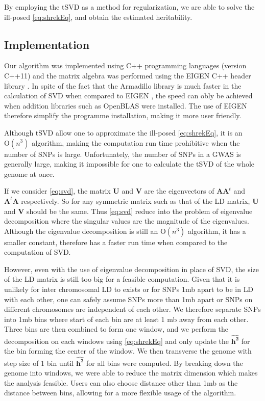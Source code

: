 			By employing the \gls{tSVD} as a method for regularization, we are able to solve the ill-posed \cref{eq:shrekEq}, and obtain the estimated heritability.
		\subsection{Implementation}
			Our algorithm was implemented using C++ programming languages (version C++11) and the matrix algebra was performed using the EIGEN C++ header library \citep{eigenweb}.
			In spite of the fact that the Armadillo library \citep{Sanderson2010} is much faster in the calculation of \gls{SVD} when compared to EIGEN \citep{Ho2011}, the speed can obly be achieved when addition libraries such as OpenBLAS were installed. 
			The use of EIGEN therefore simplify the programme installation, making it more user friendly. 
			
			Although \gls{tSVD} allow one to approximate the ill-posed \cref{eq:shrekEq}, it is an $\mathrm{O}(n^3)$ algorithm, making the computation run time prohibitive when the number of \glspl{SNP} is large.
			Unfortunately, the number of \glspl{SNP} in a \gls{GWAS} is generally large, making it impossible for one to calculate the \gls{tSVD} of the whole genome at once. 
			
			If we consider \cref{eq:svd}, the matrix $\boldsymbol{U}$ and $\boldsymbol{V}$ are the eigenvectors of $\boldsymbol{AA}^t$ and $\boldsymbol{A}^t\boldsymbol{A}$ respectively. 
			So for any symmetric matrix such as that of the \gls{LD} matrix, $\boldsymbol{U}$ and $\boldsymbol{V}$ should be the same. 
			Thus \cref{eq:svd} reduce into the problem of eigenvalue decomposition where the singular values are the magnitude of the eigenvalues. 
			Although the eigenvalue decomposition is still an $\mathrm{O}(n^3)$ algorithm, it has a smaller constant, therefore has a faster run time when compared to the computation of \gls{SVD}. 
			
			However, even with the use of eigenvalue decomposition in place of \gls{SVD}, the size of the \gls{LD} matrix is still too big for a feasible computation. 
			Given that it is unlikely for inter chromosomal \gls{LD} to exists or for \glspl{SNP} 1\gls{mb} apart to be in \gls{LD} with each other, one can safely assume \glspl{SNP} more than 1\gls{mb} apart or \glspl{SNP} on different chromosomes are independent of each other. 
			We therefore separate \glspl{SNP} into 1\gls{mb} bins where start of each bin are at least 1 \gls{mb} away from each other. 
			Three bins are then combined to form one window, and we perform the decomposition on each windows using \cref{eq:shrekEq} and only update the $\boldsymbol{\hat{h^2}}$ for the bin forming the center of the window.
			We then transverse the genome with step size of 1 bin until $\boldsymbol{\hat{h^2}}$ for all bins were computed. 
			By breaking down the genome into windows, we were able to reduce the matrix dimension which makes the analysis feasible.
			Users can also choose distance other than 1\gls{mb} as the distance between bins, allowing for a more flexible usage of the algorithm.
			
